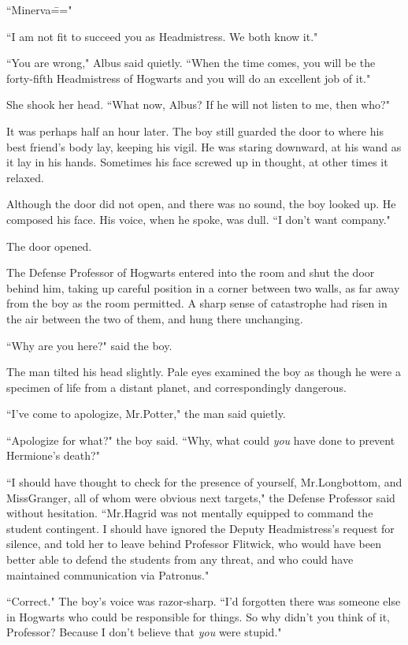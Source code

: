 ``Minerva\==="

``I am not fit to succeed you as Headmistress. We both know it."

``You are wrong," Albus said quietly. ``When the time comes, you will be the forty-fifth Headmistress of Hogwarts and you will do an excellent job of it."

She shook her head. ``What now, Albus? If he will not listen to me, then who?"

\later

It was perhaps half an hour later. The boy still guarded the door to where his best friend's body lay, keeping his vigil. He was staring downward, at his wand as it lay in his hands. Sometimes his face screwed up in thought, at other times it relaxed.

Although the door did not open, and there was no sound, the boy looked up. He composed his face. His voice, when he spoke, was dull. ``I don't want company."

The door opened.

The Defense Professor of Hogwarts entered into the room and shut the door behind him, taking up careful position in a corner between two walls, as far away from the boy as the room permitted. A sharp sense of catastrophe had risen in the air between the two of them, and hung there unchanging.

``Why are you here?" said the boy.

The man tilted his head slightly. Pale eyes examined the boy as though he were a specimen of life from a distant planet, and correspondingly dangerous.

``I've come to apologize, Mr.\?Potter," the man said quietly.

``Apologize for what?" the boy said. ``Why, what could \emph{you} have done to prevent Hermione's death?"

``I should have thought to check for the presence of yourself, Mr.\?Longbottom, and Miss\?Granger, all of whom were obvious next targets," the Defense Professor said without hesitation. ``Mr.\?Hagrid was not mentally equipped to command the student contingent. I should have ignored the Deputy Headmistress's request for silence, and told her to leave behind Professor Flitwick, who would have been better able to defend the students from any threat, and who could have maintained communication via Patronus."

``Correct." The boy's voice was razor-sharp. ``I'd forgotten there was someone else in Hogwarts who could be responsible for things. So why didn't you think of it, Professor? Because I don't believe that \emph{you} were stupid."

